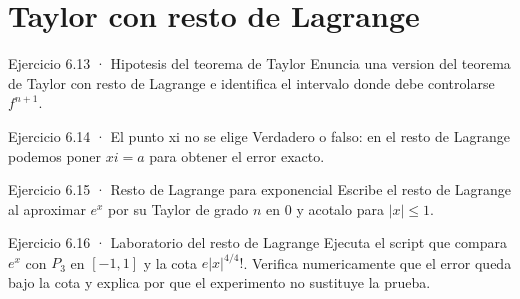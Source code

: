 \documentclass[10pt,a4paper,oneside,openany]{book}
\begin{document}
\section{Taylor con resto de Lagrange}
\begin{PSevenExerciseFixed}{Ejercicio 6.13 · Hipotesis del teorema de Taylor}
Enuncia una version del teorema de Taylor con resto de Lagrange e identifica el intervalo donde debe controlarse \(f^{n+1}\).
\end{PSevenExerciseFixed}
\begin{PSevenExerciseFixed}{Ejercicio 6.14 · El punto xi no se elige}
Verdadero o falso: en el resto de Lagrange podemos poner \(xi=a\) para obtener el error exacto.
\end{PSevenExerciseFixed}
\begin{PSevenExerciseFixed}{Ejercicio 6.15 · Resto de Lagrange para exponencial}
Escribe el resto de Lagrange al aproximar \(e^x\) por su Taylor de grado \(n\) en \(0\) y acotalo para \(|x|\le 1\).
\end{PSevenExerciseFixed}
\begin{PSevenExerciseFixed}{Ejercicio 6.16 · Laboratorio del resto de Lagrange}
Ejecuta el script que compara \(e^x\) con \(P_3\) en \([-1,1]\) y la cota \(e|x|^{4/4}!\). Verifica numericamente que el error queda bajo la cota y explica por que el experimento no sustituye la prueba.
\end{PSevenExerciseFixed}
\end{document}

